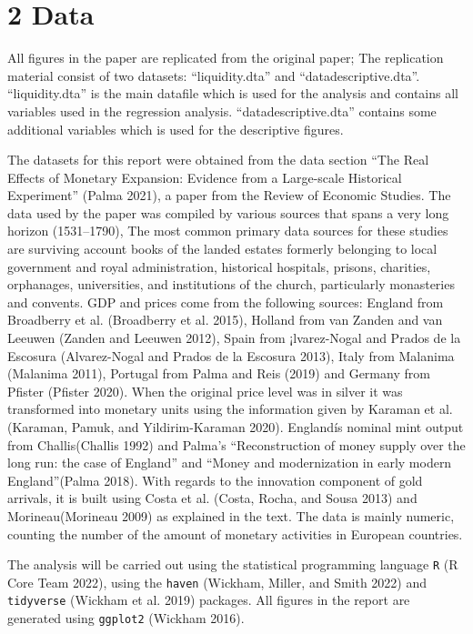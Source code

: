 \documentclass[
  letterpaper,
  DIV=11,
  numbers=noendperiod]{scrartcl}
\begin{document}
\hypertarget{data}{%
\section{2 Data}\label{data}}

All figures in the paper are replicated from the original paper; The
replication material consist of two datasets: ``liquidity.dta'' and
``datadescriptive.dta''. ``liquidity.dta'' is the main datafile which is
used for the analysis and contains all variables used in the regression
analysis. ``datadescriptive.dta'' contains some additional variables
which is used for the descriptive figures.

The datasets for this report were obtained from the data section ``The
Real Effects of Monetary Expansion: Evidence from a Large-scale
Historical Experiment'' (Palma 2021), a paper from the Review of
Economic Studies. The data used by the paper was compiled by various
sources that spans a very long horizon (1531--1790), The most common
primary data sources for these studies are surviving account books of
the landed estates formerly belonging to local government and royal
administration, historical hospitals, prisons, charities, orphanages,
universities, and institutions of the church, particularly monasteries
and convents. GDP and prices come from the following sources: England
from Broadberry et al. (Broadberry et al. 2015), Holland from van Zanden
and van Leeuwen (Zanden and Leeuwen 2012), Spain from ¡lvarez-Nogal and
Prados de la Escosura (Alvarez-Nogal and Prados de la Escosura 2013),
Italy from Malanima (Malanima 2011), Portugal from Palma and Reis (2019)
and Germany from Pfister (Pfister 2020). When the original price level
was in silver it was transformed into monetary units using the
information given by Karaman et al. (Karaman, Pamuk, and
Yildirim-Karaman 2020). Englandís nominal mint output from
Challis(Challis 1992) and Palma's ``Reconstruction of money supply over
the long run: the case of England'' and ``Money and modernization in
early modern England''(Palma 2018). With regards to the innovation
component of gold arrivals, it is built using Costa et al. (Costa,
Rocha, and Sousa 2013) and Morineau(Morineau 2009) as explained in the
text. The data is mainly numeric, counting the number of the amount of
monetary activities in European countries.

The analysis will be carried out using the statistical programming
language \texttt{R} (R Core Team 2022), using the \texttt{haven}
(Wickham, Miller, and Smith 2022) and \texttt{tidyverse} (Wickham et al.
2019) packages. All figures in the report are generated using
\texttt{ggplot2} (Wickham 2016).
\end{document}
